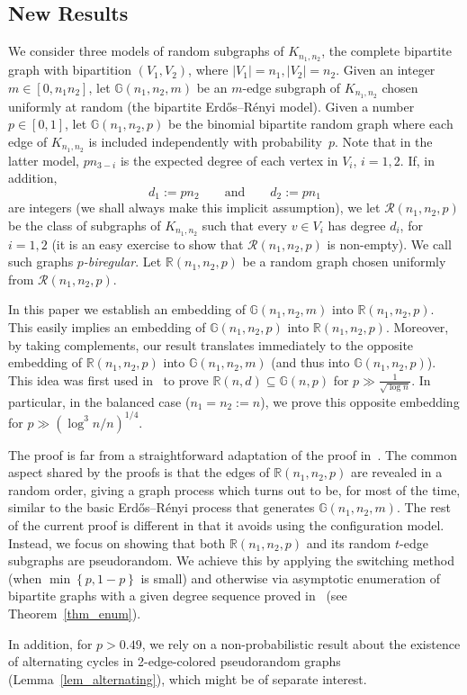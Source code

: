 \documentclass[12pt,reqno]{amsart}
\newcommand{\rc}{{\mathcal{R}}}
\newcommand{\rcnnp}{\rc(n_1,n_2,p)}
\newcommand{\R} {\mathbb R}
\newcommand{\Rnnp}{\R(n_1,n_2,p)}
\newcommand{\G} {\mathbb G}
\newcommand{\Gnnp} {\G(n_1,n_2,p)}
\newcommand{\Gnnm} {\G(n_1,n_2,m)}
\newcommand{\Knn} {K_{n_1,n_2}}
\theoremstyle{definition}
\begin{document}
\subsection{New Results}
\label{ss_new_result}
We consider three models of random subgraphs of $\Knn$, the complete bipartite graph with bipartition $(V_1, V_2)$, where $|V_1| = n_1, |V_2| = n_2$. Given an integer $m \in [0, n_1n_2]$, let $\Gnnm$ be an $m$-edge subgraph of $\Knn$ chosen uniformly at random (the bipartite Erd\H os--R\'enyi model). Given a number $p \in [0,1]$, let $\Gnnp$ be the binomial bipartite random graph where each edge of $\Knn$ is included independently with probability~$p$. Note that in the latter model, $pn_{3-i}$ is the expected degree of each vertex in $V_i$, $i=1,2$.
If, in addition,
\[
	d_1 := pn_2\qquad\text{and}\qquad d_2 := pn_1
\]
are integers (we shall always make this implicit assumption), we let $\rcnnp$ be the class of subgraphs of $\Knn$ such that every $v \in V_i$ has degree $d_i$, for $i = 1, 2$ (it is an easy exercise to show that $\rcnnp$ is non-empty). We call such graphs \emph{$p$-biregular}. Let $\Rnnp$ be a random graph chosen uniformly from $\rcnnp$.

In this paper we establish an embedding of $\G(n_1,n_2,m)$ into  $\Rnnp$. This easily implies an embedding of $\Gnnp$ into $\Rnnp$.
	Moreover, by taking complements, our result translates immediately to the opposite embedding of $\Rnnp$ into $\G(n_1,n_2,m)$ (and thus into $\Gnnp$). This idea was first used in~\cite{GIM} to prove $\R(n,d) \subseteq \G(n,p)$ for $p \gg \frac{1}{\sqrt{\log n}}$. In particular, in the balanced case ($n_1=n_2:=n$), we prove this opposite embedding  for $p \gg \left( \log^3 n / n \right)^{1/4}$.

	The proof is far from a straightforward adaptation of the proof in~\cite{DFRSc}. The common aspect shared by the proofs is that the edges of $\Rnnp$ are revealed in a random order, giving a graph process which turns out to be, for most of the time, similar to the basic Erd\H{o}s--R\'enyi process that generates $\Gnnm$. The rest of the current proof is different in that it avoids using the configuration model. Instead, we focus on showing that both $\Rnnp$ and its random $t$-edge subgraphs are pseudorandom. We achieve this by applying the switching method (when $\min \left\{ p, 1-p \right\}$ is small) and otherwise via asymptotic enumeration of bipartite graphs with a given degree sequence proved in~\cite{CGM} (see Theorem~\ref{thm_enum}).


	In addition, for $p > 0.49$, we rely on a non-probabilistic result about the existence of alternating cycles in 2-edge-colored pseudorandom graphs (Lemma~\ref{lem_alternating}), which might be of separate interest.
\end{document}
